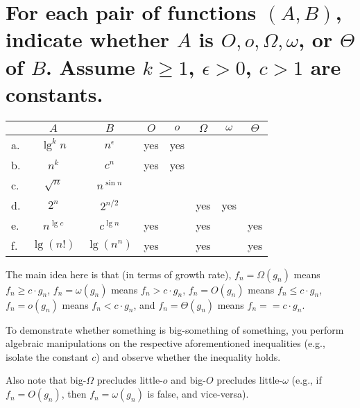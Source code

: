 \section[Problem 5]{For each pair of functions $(A, B)$, indicate whether $A$ is $O, o, \Omega, \omega$, or $\Theta$ of $B$. Assume $k \geq 1$, $\epsilon > 0$, $c > 1$ are constants.}
\begin{center}
	\begin{tabular}{lcc|c|c|c|c|c}
		& $A$ & $B$ & $O$ & $o$ & $\Omega$ & $\omega$ & $\Theta$ \\ \hline
		a. & $\lg^k n$ & $n^{\epsilon}$ & yes & yes &  &  &  \\ \hline
		b. & $n^k$ & $c^n$				& yes & yes &  &  &  \\ \hline
		c. & $\sqrt{n}$ & $n^{\sin n}$	&  &  &  &  &  \\ \hline
		d. & $2^n$ & $2^{n/2}$			&  &  & yes & yes &  \\ \hline
		e. & $n^{\lg c}$ & $c^{\lg n}$	& yes &  & yes &  & yes \\ \hline
		f. & $\lg(n!)$ & $\lg(n^n)$		& yes &  & yes &  & yes 
	\end{tabular}
\end{center}

The main idea here is that (in terms of growth rate), 
$f_n = \Omega(g_n)$ means	$f_n \geq c \cdot g_n$,
$f_n = \omega(g_n)$ means	$f_n > c \cdot g_n$,
$f_n = O(g_n)$ means		$f_n \leq c \cdot g_n$,
$f_n = o(g_n)$ means		$f_n < c \cdot g_n$, and
$f_n = \Theta(g_n)$ means	$f_n == c \cdot g_n$. 

To demonstrate whether something is big-something of something, you perform algebraic manipulations on the respective aforementioned inequalities (e.g., isolate the constant $c$) and observe whether the inequality holds. 

Also note that big-$\Omega$ precludes little-$o$ and big-$O$ precludes little-$\omega$ (e.g., if $f_n = O(g_n)$, then $f_n = \omega(g_n)$ is false, and vice-versa).
